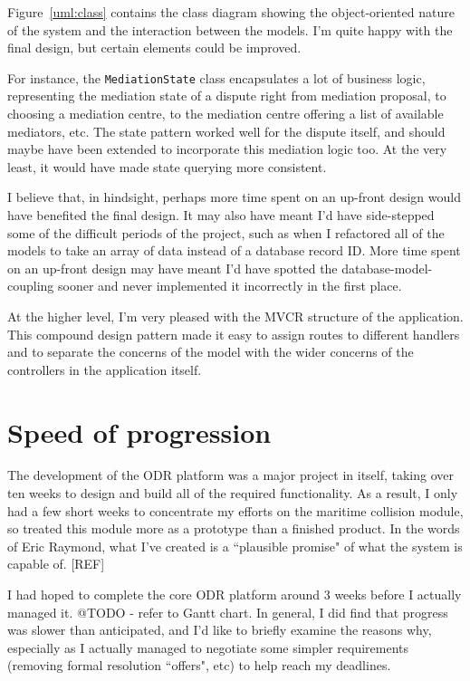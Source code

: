 Figure~\ref{uml:class} contains the class diagram showing the object-oriented nature of the system and the interaction between the models. I'm quite happy with the final design, but certain elements could be improved.

For instance, the \lstinline{MediationState} class encapsulates a lot of business logic, representing the mediation state of a dispute right from mediation proposal, to choosing a mediation centre, to the mediation centre offering a list of available mediators, etc. The state pattern worked well for the dispute itself, and should maybe have been extended to incorporate this mediation logic too. At the very least, it would have made state querying more consistent.

I believe that, in hindsight, perhaps more time spent on an up-front design would have benefited the final design. It may also have meant I'd have side-stepped some of the difficult periods of the project, such as when I refactored all of the models to take an array of data instead of a database record ID. More time spent on an up-front design may have meant I'd have spotted the database-model-coupling sooner and never implemented it incorrectly in the first place.

At the higher level, I'm very pleased with the MVCR structure of the application. This compound design pattern made it easy to assign routes to different handlers and to separate the concerns of the model with the wider concerns of the controllers in the application itself.

\section{Speed of progression}

The development of the ODR platform was a major project in itself, taking over ten weeks to design and build all of the required functionality. As a result, I only had a few short weeks to concentrate my efforts on the maritime collision module, so treated this module more as a prototype than a finished product. In the words of Eric Raymond, what I've created is a ``plausible promise" of what the system is capable of. [REF] %

I had hoped to complete the core ODR platform around 3 weeks before I actually managed it. @TODO - refer to Gantt chart. In general, I did find that progress was slower than anticipated, and I'd like to briefly examine the reasons why, especially as I actually managed to negotiate some simpler requirements (removing formal resolution ``offers", etc) to help reach my deadlines.

